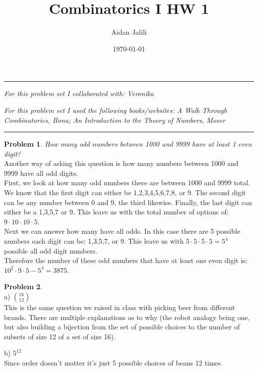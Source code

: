\documentclass{article}
\title{Combinatorics I HW 1}
\author{Aidan Jalili}
\date{\today}
\theoremstyle{definition}
\newtheorem{problem}{Problem}
\newcommand{\collaborators}[1]{\noindent\textit{For this problem set I collaborated with: Veronika}}
\newcommand{\resources}[1]{\noindent\textit{For this problem set I used the following books/websites: A Walk Through Combinatorics, Bona; An Introduction to the Theory of Numbers, Moser}}
\begin{document}
\maketitle


\hrule
\collaborators{[names of collaborators]}

\resources{[titles/links to resources]}
\hrule




\begin{problem}
\textit{How many odd numbers between 1000 and 9999 have at least 1 even digit?}\\

Another way of asking this question is how many numbers between 1000 and 9999 have all odd digits.\\

First, we look at how many odd numbers there are between 1000 and 9999 total. We know that the first digit
can either be 1,2,3,4,5,6,7,8, or 9. The second digit can be any number between 0 and 9, the third likewise.
Finally, the last digit can either be a 1,3,5,7 or 9. This leave us with the total number of options of:
$9\cdot10\cdot10\cdot5$.\\

Next we can answer how many have all odds. In this case there are 5 possible numbers each digit can be:
1,3,5,7, or 9. This leave us with $5\cdot5\cdot5\cdot5 = 5^4$ possible all odd digit numbers.\\

Therefore the number of these odd numbers that have at least one even digit is:\\

$10^2\cdot9\cdot5-5^4=3875$.\\

\end{problem}

\begin{problem}
    \ \\

    a) $16 \choose 12$\\

    This is the same question we raised in class with picking beer from different brands. There are multiple explanations as to why
    (the robot analogy being one, but also building a bijection from the set of possible choices to the number of subsets of size 12 of a set of size 16).

    b) $5^{12}$\\

    Since order doesn't matter it's just 5 possible choices of beans 12 times.
\end{problem}
\end{document}
